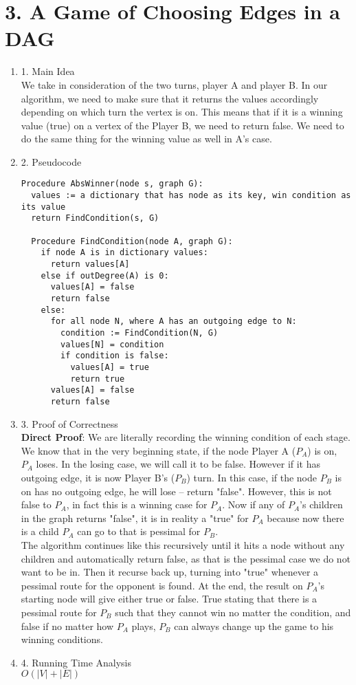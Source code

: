 \documentclass[11pt]{article}
\newenvironment{qparts}{\begin{enumerate}[{(}a{)}]}{\end{enumerate}}
\begin{document}
\section*{3. A Game of Choosing Edges in a DAG}
\begin{qparts}
\item[1.] Main Idea \\
We take in consideration of the two turns, player A and player B. In our algorithm, we need to make sure that it returns the values accordingly depending on which turn the vertex is on. This means that if it is a winning value (true) on a vertex of the Player B, we need to return false. We need to do the same thing for the winning value as well in A's case. 
\item[2.] Pseudocode
\begin{verbatim}
Procedure AbsWinner(node s, graph G):
  values := a dictionary that has node as its key, win condition as its value
  return FindCondition(s, G)
  
  Procedure FindCondition(node A, graph G):
    if node A is in dictionary values:
      return values[A]
    else if outDegree(A) is 0:
      values[A] = false
      return false
    else: 
      for all node N, where A has an outgoing edge to N:
        condition := FindCondition(N, G)
        values[N] = condition
        if condition is false:
          values[A] = true
          return true
      values[A] = false
      return false
\end{verbatim}

\item[3.] Proof of Correctness \\
\textbf{Direct Proof}: We are literally recording the winning condition of each stage. We know that in the very beginning state, if the node Player A ($P_A$) is on, $P_A$ loses. In the losing case, we will call it to be false. However if it has outgoing edge, it is now Player B's ($P_B$) turn. In this case, if the node $P_B$ is on has no outgoing edge, he will lose -- return "false". However, this is not false to $P_A$, in fact this is a winning case for $P_A$. Now if any of $P_A$'s children in the graph returns "false", it is in reality a "true" for $P_A$ because now there is a child $P_A$ can go to that is pessimal for $P_B$. \\

The algorithm continues like this recursively until it hits a node without any children and automatically return false, as that is the pessimal case we do not want to be in. Then it recurse back up, turning into "true" whenever a pessimal route for the opponent is found. At the end, the result on $P_A$'s starting node will give either true or false. True stating that there is a pessimal route for $P_B$ such that they cannot win no matter the condition, and false if no matter how $P_A$ plays, $P_B$ can always change up the game to his winning conditions.
\item[4.] Running Time Analysis \\
$O(|V| + |E|)$ \\


\end{qparts}
\end{document}
